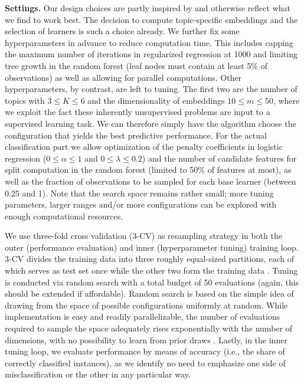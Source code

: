 \textbf{Settings.}
Our design choices are partly inspired by \citet{probstetal2019} and otherwise 
reflect what we find to work best.
The decision to compute topic-specific embeddings and the selection 
of learners is such a choice already.
We further fix some hyperparameters in advance to reduce computation time. 
This includes capping the maximum number of iterations in regularized 
regression at 1000 and limiting tree growth in the random forest (leaf nodes 
must contain at least 5\% of observations) as well as allowing for parallel 
computations. 
Other hyperparameters, by contrast, are left to tuning.
The first two are the number of topics with $3\leq K \leq 6$ and the 
dimensionality of embeddings $10\leq m \leq 50$, 
where we exploit the fact these inherently unsupervised problems are input to a 
supervised learning task. 
We can therefore simply have the algorithm choose the configuration that yields
the best predictive performance.
For the actual classification part we allow optimization of the penalty 
coefficients in logistic regression ($0 \leq \alpha \leq 1$ and $0 \leq \lambda
\leq 0.2$) and the number of candidate features for split computation in the 
random forest (limited to 50\% of features at most), as well as the fraction of 
observations to be sampled for each base learner (between 0.25 and 1).
Note that the search space remains rather small; more tuning parameters, larger 
ranges and/or more configurations can be explored with enough computational 
resources.

We use three-fold cross validation (3-CV) as resampling strategy in both the 
outer (performance evaluation) and inner (hyperparameter tuning) training loop.
3-CV divides the training data into three roughly equal-sized partitions, each 
of which serves as test set once while the other two form the training data 
\citep{japkowiczshah2011}.
Tuning is conducted via random search with a total budget of 50 evaluations 
(again, this should be extended if affordable).
Random search is based on the simple idea of drawing from the space of possible 
configurations uniformly at random.
While implementation is easy and readily parallelizable, the number of 
evaluations required to sample the space adequately rises exponentially with the
number of dimensions, with no possibility to learn from prior draws 
\citep{feurerhutter2019}.
Lastly, in the inner tuning loop, we evaluate performance by means of accuracy 
(i.e., the share of correctly classified instances), as we identify no need to 
emphasize one side of misclassification or the other in any particular way.

